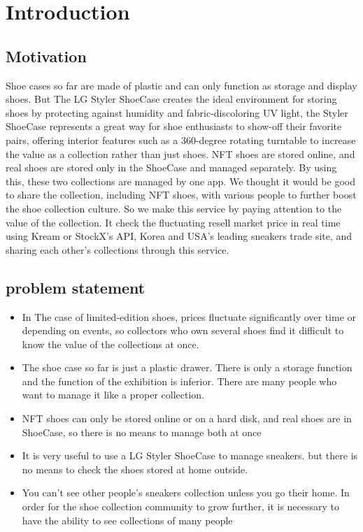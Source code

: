 \documentclass[conference]{IEEEtran}
\begin{document}
\section{Introduction}
\subsection{Motivation}
Shoe cases so far are made of plastic and can only function as storage and display shoes. But The LG Styler ShoeCase creates the ideal environment for storing shoes by protecting against humidity and fabric-discoloring UV light, the Styler ShoeCase represents a great way for shoe enthusiasts to show-off their favorite pairs, offering interior features such as a 360-degree rotating turntable to increase the value as a collection rather than just shoes. 
NFT shoes are stored online, and real shoes are stored only in the ShoeCase and managed separately. By using this, these two collections are managed by one app. We thought it would be good to share the collection, including NFT shoes, with various people to further boost the shoe collection culture.
So we make this service by paying attention to the value of the collection. It check the fluctuating resell market price in real time using Kream or StockX's API, Korea and USA's leading sneakers trade site, and sharing each other's collections through this service.


\subsection{problem statement}
\begin{itemize}
\item In The case of limited-edition shoes, prices fluctuate significantly over time or depending on events, so collectors who own several shoes find it difficult to know the value of the collections at once.
\item The shoe case so far is just a plastic drawer. There is only a storage function and the function of the exhibition is inferior. There are many people who want to manage it like a proper collection.
\item NFT shoes can only be stored online or on a hard disk, and real shoes are in ShoeCase, so there is no means to manage both at once
\item It is very useful to use a LG Styler ShoeCase to manage sneakers. but there is no means to check the shoes stored at home outside.
\item You can't see other people's sneakers collection unless you go their home. In order for the shoe collection community to grow further, it is necessary to have the ability to see collections of many people
\end{itemize}
\end{document}
